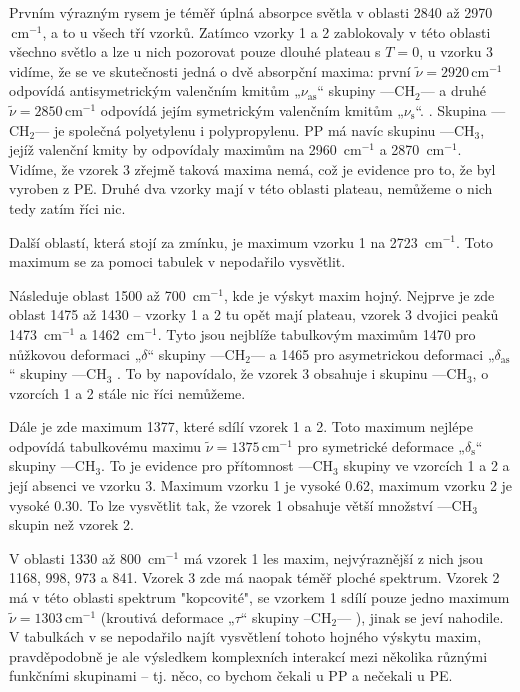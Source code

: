 \documentclass[10pt,a4paper]{article}
\renewcommand{\U}[1]{\ensuremath{\,\mathrm{#1}}}
\newcommand{\°}{\degree}
\begin{document}
Prvním výrazným rysem je téměř úplná absorpce světla v oblasti 2840 až 2970 \U{cm^{-1}}, a to u všech tří vzorků. Zatímco vzorky 1 a 2 zablokovaly v této oblasti všechno světlo a lze u nich pozorovat pouze dlouhé plateau s $T=0$, u vzorku 3 vidíme, že se ve skutečnosti jedná o dvě absorpční maxima: první $\tilde\nu = 2920 \U{cm^{-1}}$ odpovídá antisymetrickým valenčním kmitům „$\nu_\mathrm{as}$“ skupiny —CH$_2$— a druhé $\tilde\nu = 2850 \U{cm^{-1}}$ odpovídá jejím symetrickým valenčním kmitům „$\nu_\mathrm{s}$“. \cite{studijni-text}. Skupina —CH$_2$— je společná polyetylenu i polypropylenu. PP má navíc skupinu —CH$_3$, jejíž valenční kmity by odpovídaly maximům na 2960 \U{cm^{-1}} a 2870 \U{cm^{-1}}. Vidíme, že vzorek 3 zřejmě taková maxima nemá, což je evidence pro to, že byl vyroben z PE. Druhé dva vzorky mají v této oblasti plateau, nemůžeme o nich tedy zatím říci nic.

Další oblastí, která stojí za zmínku, je maximum vzorku 1 na 2723 \U{cm^{-1}}. Toto maximum se za pomoci tabulek v \cite{studijni-text} nepodařilo vysvětlit.

Následuje oblast 1500 až 700 \U{cm^{-1}}, kde je výskyt maxim hojný. Nejprve je zde oblast 1475 až 1430 – vzorky 1 a 2 tu opět mají plateau, vzorek 3 dvojici peaků 1473 \U{cm^{-1}} a 1462 \U{cm^{-1}}. Tyto jsou nejblíže tabulkovým maximům 1470 pro nůžkovou deformaci „$\delta$“ skupiny —CH$_2$— a 1465 pro asymetrickou deformaci „$\delta_\mathrm{as}$“ skupiny —CH$_3$ \cite{studijni-text}. To by napovídalo, že vzorek 3 obsahuje i skupinu —CH$_3$, o vzorcích 1 a 2 stále nic říci nemůžeme.

Dále je zde maximum 1377, které sdílí vzorek 1 a 2. Toto maximum nejlépe odpovídá tabulkovému maximu $\tilde\nu = 1375 \U{cm^{-1}}$ pro symetrické deformace „$\delta_\mathrm{s}$“ skupiny —CH$_3$. To je evidence pro přítomnost —CH$_3$ skupiny ve vzorcích 1 a 2 a její absenci ve vzorku 3. Maximum vzorku 1 je vysoké 0.62, maximum vzorku 2 je vysoké 0.30. To lze vysvětlit tak, že vzorek 1 obsahuje větší množství —CH$_3$ skupin než vzorek 2.

V oblasti 1330 až 800 \U{cm^{-1}} má vzorek 1 les maxim, nejvýraznější z nich jsou 1168, 998, 973 a 841. Vzorek 3 zde má naopak téměř ploché spektrum. Vzorek 2 má v této oblasti spektrum "kopcovité", se vzorkem 1 sdílí pouze jedno maximum $\tilde\nu = 1303 \U{cm^{-1}}$ (kroutivá deformace „$\tau$“ skupiny –CH$_2$— \cite{studijni-text}), jinak se jeví nahodile. V tabulkách v \cite{studijni-text} se nepodařilo najít vysvětlení tohoto hojného výskytu maxim, pravděpodobně je ale výsledkem komplexních interakcí mezi několika různými funkčními skupinami – tj. něco, co bychom čekali u PP a nečekali u PE.
\end{document}
